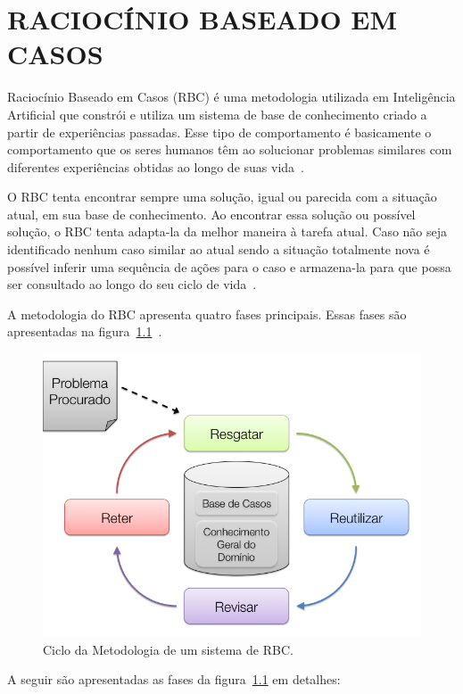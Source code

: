\chapter{RACIOCÍNIO BASEADO EM CASOS}
\label{cap:rbc}

Raciocínio Baseado em Casos (RBC) é uma metodologia utilizada em Inteligência Artificial que constrói e utiliza um sistema de base de conhecimento criado a partir de experiências passadas. Esse tipo de comportamento é basicamente o comportamento que os seres humanos têm ao solucionar problemas similares com diferentes experiências obtidas ao longo de suas vida~\cite{Lopez:2013}.

O RBC tenta encontrar sempre uma solução, igual ou parecida com a situação atual, em sua base de conhecimento. Ao encontrar essa solução ou possível solução, o RBC tenta adapta-la da melhor maneira à tarefa atual. Caso não seja identificado nenhum caso similar ao atual sendo a situação totalmente nova é possível inferir uma sequência de ações para o caso e armazena-la para que possa ser consultado ao longo do seu ciclo de vida~\cite{Lopez:2013}.

A metodologia do RBC apresenta quatro fases principais. Essas fases são apresentadas na figura~\ref{fig:rbcciclo}~\cite{Lopez:2013}.

\begin{figure}[h!]
	\centering
	\includegraphics[scale=0.5]{images/cbr-cycle.png}
	\caption{Ciclo da Metodologia de um sistema de RBC.}
	\label{fig:rbcciclo}
\end{figure}

A seguir são apresentadas as fases da figura~\ref{fig:rbcciclo} em detalhes:

